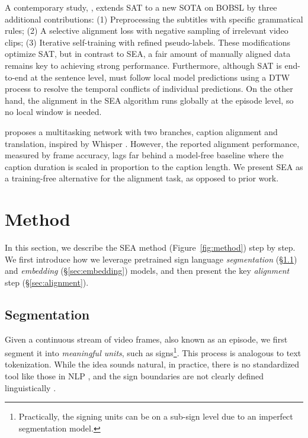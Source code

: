 \documentclass[11pt]{article}
\begin{document}
A contemporary study, \citet{jang2025deep}, extends SAT to a new SOTA on BOBSL by three additional contributions: 
(1) Preprocessing the subtitles with specific grammatical
rules;
(2) A selective alignment loss with negative sampling of irrelevant video clips;
(3) Iterative self-training with refined pseudo-labels.
These modifications optimize SAT, but in contrast to SEA, a fair amount of manually aligned data remains key to achieving strong performance. 
Furthermore, although SAT is end-to-end at the sentence level, \citet{bull2021aligning,jang2025deep} must follow local model predictions using a DTW process to resolve the temporal conflicts of individual predictions. On the other hand, the alignment in the SEA algorithm runs globally at the episode level, so no local window is needed. 

\citet{tanzer-2025-fleurs} proposes a multitasking network with two branches, caption alignment and translation, inspired by Whisper \cite{radford2023robust}.
However, the reported alignment performance, measured by frame accuracy, lags far behind a model-free baseline where the caption duration is scaled in proportion to the caption length.
We present SEA as a training-free alternative for the alignment task, as opposed to prior work.

\section{Method}
\label{sec:method}
In this section, we describe the SEA method (Figure~\ref{fig:method}) step by step.
We first introduce how we leverage pretrained sign language \textit{segmentation} (\S\ref{sec:segmentation}) and \textit{embedding} (\S\ref{sec:embedding}) models, and then present the key \textit{alignment} step (\S\ref{sec:alignment}).

\subsection{Segmentation}
\label{sec:segmentation}

Given a continuous stream of video frames, also known as an episode, we first segment it into \textit{meaningful units}, such as signs\footnote{Practically, the signing units can be on a sub-sign level due to an imperfect segmentation model.}. 
This process is analogous to text tokenization.
While the idea sounds natural, in practice, there is no standardized tool like those in NLP \cite{sennrich-etal-2016-neural,kudo-richardson-2018-sentencepiece}, and the sign boundaries are not clearly defined linguistically \cite{hanke2012does}. 
\end{document}
